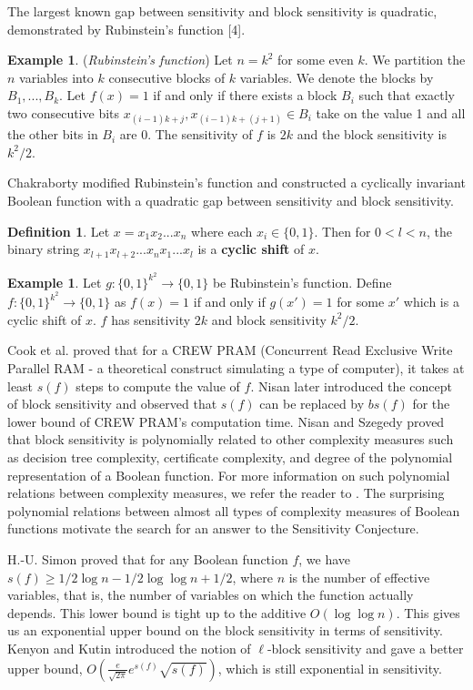 \documentclass[psamsfonts]{amsart}
\theoremstyle{definition}
\newtheorem{defn}[theorem]{Definition}
\newtheorem{exmp}[theorem]{Example}
\theoremstyle{remark}
\numberwithin{equation}{section}
\begin{document}
		The largest known gap between sensitivity and block sensitivity is quadratic, demonstrated by Rubinstein's function [4].
	\begin{exmp} ({\it Rubinstein's function})
		Let $n = k^2$ for some even $k$. We partition the $n$ variables into $k$ consecutive blocks of $k$ variables. We denote the blocks by $B_1,...,B_k$. Let $f(x) = 1$ if and only if there exists a block $B_i$ such that exactly two consecutive bits $x_{(i-1)k+j}, x_{(i-1)k+(j+1)} \in B_i$ take on the value 1 and all the other bits in $B_i$ are 0. The sensitivity of $f$ is $2k$ and the block sensitivity is $k^2/2$.
	\end{exmp}

	Chakraborty modified Rubinstein's function and constructed a cyclically invariant Boolean function with a quadratic gap between sensitivity and block sensitivity.
\begin{defn} Let $x = x_1x_2...x_n$ where each $x_i \in \{0,1\}$. Then for $0 < l < n$, the binary string $x_{l+1}x_{l+2}...x_nx_1...x_l$ is a \textbf{cyclic shift} of $x$.
\end{defn}

	\begin{exmp}
		Let $g : \{0,1\}^{k^2} \rightarrow \{0,1\}$ be Rubinstein's function. Define $f : \{0,1\}^{k^2} \rightarrow \{0,1\}$ as $f(x) = 1$ if and only if $g(x') = 1$ for some $x'$ which is a cyclic shift of $x$. $f$ has sensitivity $2k$ and block sensitivity $k^2/2$.
	\end{exmp}
	Cook et al. \cite{CDR} proved that for a CREW PRAM (Concurrent Read Exclusive Write Parallel RAM - a theoretical construct simulating a type of computer), it takes at least $s(f)$ steps to compute the value of $f$. Nisan \cite{N} later introduced the concept of block sensitivity and observed that $s(f)$ can be replaced by $bs(f)$ for the lower bound of CREW PRAM's 
	computation time.  
	Nisan and Szegedy \cite{NS} proved that block sensitivity is polynomially related to other complexity measures such as decision tree complexity, certificate complexity, and degree of the polynomial representation of a Boolean function.  For more information on such polynomial relations between complexity measures, we refer the reader to \cite{HKP}.  The surprising polynomial relations between almost all types of complexity measures of Boolean functions motivate the search for an answer to the Sensitivity Conjecture. 
	


	H.-U. Simon \cite{S} proved that for any Boolean function $f$, we have $s(f) \geq 1/2\log n -1/2\log{\log n} + 1/2$, where $n$ is the number of effective variables, that is, the number of variables on which the function actually depends. This lower bound is tight up to the additive  $O(\log{\log n})$. This gives us an exponential upper bound on the block sensitivity in terms of sensitivity. Kenyon and Kutin \cite{KK} introduced the notion of $\ell$-block sensitivity and gave a better upper bound, $O(\frac{e}{\sqrt{2\pi}}e^{s(f)}\sqrt{s(f)})$, which is still exponential in sensitivity.
\end{document}
